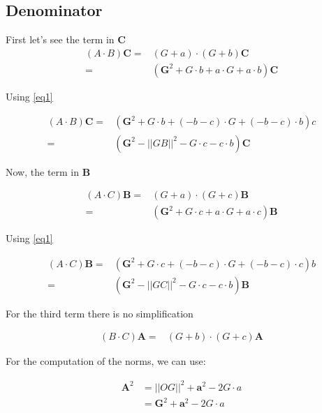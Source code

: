 \documentclass[10pt,a4paper]{article}
\begin{document}
\subsection{Denominator}


First let's see the term in $\mathbf{C}$
\begin{align*}
 \left({A}\cdot {B}\right)\mathbf{C}
	=& \left( G + a \right) \cdot \left( G + b \right) \mathbf{C} \\
	 =& (\mathbf{G}^2 +  G \cdot b	+ a \cdot G + a \cdot b    ) \mathbf{C}
\end{align*}

Using \eqref{eq1}

\begin{align}
 \left({A}\cdot {B}\right)\mathbf{C}
	 =& (\mathbf{G}^2 +  G \cdot b	+ (-b - c) \cdot G + (-b - c) \cdot b    ) c \nonumber \\
	 =& (\mathbf{G}^2 - ||GB||^2 - G \cdot c - c \cdot b)\mathbf{C}
\end{align}



Now, the term in $\mathbf{B}$


\begin{align*}
 \left({A}\cdot {C}\right)\mathbf{B} 
	=& \left( G + a \right) \cdot \left( G + c \right) \mathbf{B} \\
	 =& (\mathbf{G}^2 +  G \cdot c	+ a \cdot G + a \cdot c    ) \mathbf{B}
\end{align*}

Using \eqref{eq1}

\begin{align}
 \left({A}\cdot {C}\right)\mathbf{B}
	 =& (\mathbf{G}^2 +  G \cdot c	+ (-b - c) \cdot G + (-b - c) \cdot c    ) b \nonumber \\
	 =& (\mathbf{G}^2 - ||GC||^2 - G \cdot c - c \cdot b)\mathbf{B}
\end{align}


For the third term there is no simplification

\begin{align}
 \left({B}\cdot {C}\right)\mathbf{A}
	=& \left( G + b \right) \cdot \left( G + c \right) \mathbf{A}
\end{align}


For the computation of the norms, we can use:

\begin{align*}
\mathbf{A}^2 &= ||OG||^2 + \mathbf{a}^2 - 2 G \cdot a \\
        &=  \mathbf{G}^2 + \mathbf{a}^2 - 2 G \cdot a 
\end{align*}
\end{document}
